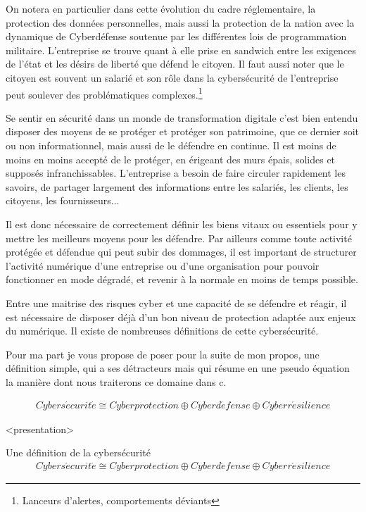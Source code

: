 On notera en particulier dans cette évolution du cadre réglementaire,  la protection des données personnelles, mais aussi la protection de la nation avec la dynamique de Cyberdéfense soutenue par les différentes lois de programmation militaire. L'entreprise se trouve quant à elle prise en sandwich entre les exigences de l'état et les désirs de liberté  que défend le citoyen. Il faut aussi noter que le citoyen est souvent un salarié et son rôle dans la cybersécurité de l'entreprise peut soulever des problématiques complexes.\footnote{Lanceurs d'alertes, comportements déviants}
 
Se sentir en sécurité dans un monde de transformation digitale c'est bien entendu disposer des moyens de se protéger et protéger son patrimoine, que ce dernier soit ou non informationnel, mais aussi de le défendre en continue. Il est moins de moins en moins accepté de le protéger, en érigeant des murs épais, solides et supposés infranchissables. L'entreprise a besoin de faire circuler rapidement les savoirs, de partager largement des informations entre les salariés, les clients, les citoyens, les fournisseurs...


Il est donc nécessaire de correctement définir les biens vitaux ou essentiels pour y mettre les meilleurs moyens pour les défendre. Par ailleurs comme toute activité protégée et défendue qui peut subir des dommages, il est important de structurer l'activité numérique d'une entreprise ou d'une organisation pour pouvoir fonctionner en mode dégradé, et revenir à la normale en moins de temps possible.


Entre une maitrise des risques cyber et une capacité de se défendre et réagir, il est nécessaire de disposer déjà d'un bon niveau de protection adaptée aux enjeux du numérique. Il existe de nombreuses définitions de cette cybersécurité.

Pour ma part je vous propose de poser pour la suite de mon propos, une définition simple, qui a ses détracteurs mais qui résume en une pseudo équation la manière dont nous traiterons ce domaine dans c\ecours. \\
\begin{nota}
\begin{align}
Cybers\acute{e}curit\acute{e} \cong Cyberprotection\oplus Cyberd\acute{e}fense \oplus Cyberr\acute{e}silience
\end{align}
\end{nota}


<presentation>\begin{frame}{Une définition de la cybersécurité}
\begin{align}
Cybers\acute{e}curit\acute{e} \cong Cyberprotection\oplus Cyberd\acute{e}fense \oplus Cyberr\acute{e}silience
\end{align}
\end{frame}

